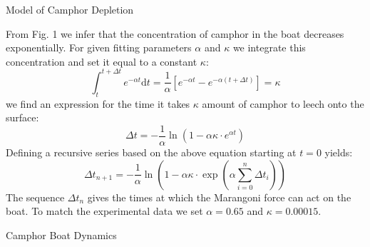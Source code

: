 \documentclass[
    a0paper, %
    portrait, %
    fontscale=0.28 %
    ]{baposter}
\newcommand{\beq}{\begin{equation}}
\newcommand{\eeq}{\end{equation}}
\newcommand{\of}[1]{\left(#1\right)}
\begin{document}
\begin{poster}
\begin{posterbox}[name=camphor,column=0,span=2, below=data1]{Model of Camphor Depletion}
\setlength{\abovedisplayskip}{4pt}
\setlength{\belowdisplayskip}{4pt}

From Fig. 1 we infer that the concentration of camphor in the boat decreases exponentially. For given fitting parameters $\alpha$ and $\kappa$ we integrate this concentration and set it equal to a constant $\kappa$:
\beq\int_{t}^{t+\Delta t} e^{-\alpha t} \mathrm{d}t = \frac{1}{\alpha}\left[ e^{-\alpha t} - e^{-\alpha\of{t+\Delta t}}\right] = \kappa\eeq
we find an expression for the time it takes $\kappa$ amount of camphor to leech onto the surface:  
\vspace{-2mm}
\beq \Delta t  = -\frac{1}{\alpha}\ln\of{1-\alpha \kappa\cdot e^{\alpha t}} \eeq
Defining a recursive series based on the above equation starting at $t=0$ yields:
\vspace{-1mm}
\beq \Delta t_{n+1} =  -\frac{1}{\alpha}\ln\of{1-\alpha \kappa \cdot \exp\of{\alpha\displaystyle\sum_{i=0}^{n}\Delta t_i}} \label{delta_t}\eeq
The sequence $\Delta t_n$ gives the times at which the Marangoni force can act on the boat. To match the experimental data we set $\alpha=0.65$ and $\kappa=0.00015$.
\end{posterbox}


\begin{posterbox}[name=data2,column=2,span=2, below=intro]{Camphor Boat Dynamics}



\end{posterbox}
\end{poster}
\end{document}
